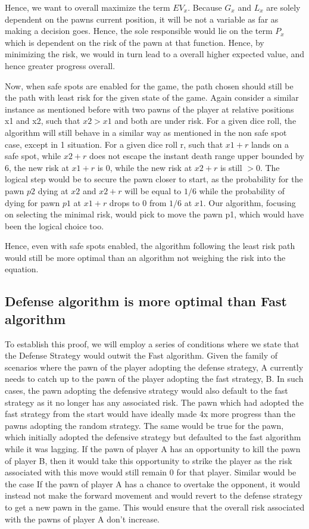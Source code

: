 \documentclass{article} %
\begin{document}
Hence, we want to overall maximize the term $EV_x$. Because $G_x$ and $L_x$ are solely dependent on the pawns current position, it will be not a variable as far as making a decision goes. Hence, the sole responsible would lie on the term $P_x$ which is dependent on the risk of the pawn at that function. Hence, by minimizing the risk, we would in turn lead to a overall higher expected value, and hence greater progress overall.

Now, when safe spots are enabled for the game, the path chosen should still be the path with least risk for the given state of the game. Again consider a similar instance as mentioned before with two pawns of the player at relative positions x1 and x2, such that $x2>x1$ and both are under risk. For a given dice roll, the algorithm will still behave in a similar way as mentioned in the non safe spot case, except in 1 situation. For a given dice roll r, such that $x1+r$ lands on a safe spot, while $x2+r$ does not escape the instant death range upper bounded by 6, the new risk at $x1+r$ is 0, while the new risk at $x2+r$ is still $>$0. The logical step would be to secure the pawn closer to start, as the probability for the pawn $p2$ dying at $x2$ and $x2+r$ will be equal to $1/6$ while the probability of dying for pawn $p1$ at $x1+r$ drops to $0$ from $1/6$ at $x1$. Our algorithm, focusing on selecting the minimal risk, would pick to move the pawn p1, which would have been the logical choice too.

Hence, even with safe spots enabled, the algorithm following the least risk path would still be more optimal than an algorithm not weighing the risk into the equation.


\subsection{Defense algorithm is more optimal than Fast algorithm}
To establish this proof, we will employ a series of conditions where we state that the Defense Strategy would outwit the Fast algorithm. 
Given the family of scenarios where the pawn of the player adopting the defense strategy, A currently needs to catch up to the pawn of the player adopting the fast strategy, B. In such cases, the pawn adopting the defensive strategy would also default to the fast strategy as it no longer has any associated risk. The pawn which had adopted the fast strategy from the start would have ideally made 4x more progress than the pawns adopting the random strategy. The same would be true for the pawn, which initially adopted the defensive strategy but defaulted to the fast algorithm while it was lagging.  
If the pawn of player A has an opportunity to kill the pawn of player B, then it would take this opportunity to strike the player as the risk associated with this move would still remain 0 for that player. Similar would be the case 
If the pawn of player A has a chance to overtake the opponent, it would instead not make the forward movement and would revert to the defense strategy to get a new pawn in the game. This would ensure that the overall risk associated with the pawns of player A don’t increase.
\end{document}
